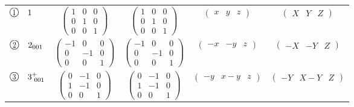 \documentclass[fleqn,10pt,landscape]{jsarticle}
\begin{document}
\begin{center}
\begin{longtable}{lcccc}
$ {\ooalign{\hfil\resizebox{.8\width}{\height}{1}\hfil\crcr\raise.1ex\hbox{\large$\bigcirc$}}}\quad 1 $ & $ \begin{pmatrix} 1 & 0 & 0 \\ 0 & 1 & 0 \\ 0 & 0 & 1 \end{pmatrix} $ & $ \begin{pmatrix} 1 & 0 & 0 \\ 0 & 1 & 0 \\ 0 & 0 & 1 \end{pmatrix} $ & $ \begin{pmatrix} x & y & z \end{pmatrix} $ & $ \begin{pmatrix} X & Y & Z \end{pmatrix} $ \\
$ {\ooalign{\hfil\resizebox{.8\width}{\height}{2}\hfil\crcr\raise.1ex\hbox{\large$\bigcirc$}}}\quad 2{}_{001} $ & $ \begin{pmatrix} -1 & 0 & 0 \\ 0 & -1 & 0 \\ 0 & 0 & 1 \end{pmatrix} $ & $ \begin{pmatrix} -1 & 0 & 0 \\ 0 & -1 & 0 \\ 0 & 0 & 1 \end{pmatrix} $ & $ \begin{pmatrix} - x & - y & z \end{pmatrix} $ & $ \begin{pmatrix} - X & - Y & Z \end{pmatrix} $ \\
$ {\ooalign{\hfil\resizebox{.8\width}{\height}{3}\hfil\crcr\raise.1ex\hbox{\large$\bigcirc$}}}\quad 3^{+}_{\,\,001} $ & $ \begin{pmatrix} 0 & -1 & 0 \\ 1 & -1 & 0 \\ 0 & 0 & 1 \end{pmatrix} $ & $ \begin{pmatrix} 0 & -1 & 0 \\ 1 & -1 & 0 \\ 0 & 0 & 1 \end{pmatrix} $ & $ \begin{pmatrix} - y & x - y & z \end{pmatrix} $ & $ \begin{pmatrix} - Y & X - Y & Z \end{pmatrix} $ \\

\end{longtable}
\end{center}
\end{document}

